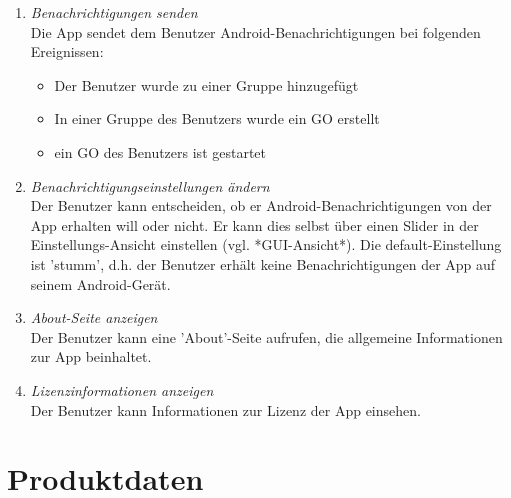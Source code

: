 \documentclass[parskip=full]{scrartcl}
\def\threedigits#1{%
  \ifnum#1<100 0\fi
  \ifnum#1<10 0\fi
  \number#1}
\begin{document}
\begin{enumerate}[label={\textbf{/F\protect\threedigits{\theenumi}0/}}, leftmargin=*, resume]	
 \item \colorbox{shadecolor}{\textit{Benachrichtigungen senden}}\\
	Die App sendet dem Benutzer Android-Benachrichtigungen bei folgenden Ereignissen:
	\begin{itemize}
		\item Der Benutzer wurde zu einer Gruppe hinzugefügt
		\item In einer Gruppe des Benutzers wurde ein GO erstellt
		\item ein GO des Benutzers ist gestartet
	\end{itemize}
	\item \colorbox{shadecolor}{\textit{Benachrichtigungseinstellungen ändern}} \\
	Der Benutzer kann entscheiden, ob er Android-Benachrichtigungen von der App erhalten will oder nicht. Er kann dies selbst über einen Slider in der Einstellungs-Ansicht einstellen (vgl. *GUI-Ansicht*). Die default-Einstellung ist 'stumm', d.h. der Benutzer erhält keine Benachrichtigungen der App auf seinem Android-Gerät.
	\item \textit{About-Seite anzeigen} \\
	Der Benutzer kann eine 'About'-Seite aufrufen, die allgemeine Informationen zur App beinhaltet.
	\item \textit{Lizenzinformationen anzeigen} \\
	Der Benutzer kann Informationen zur Lizenz der App einsehen.
\end{enumerate}

\newpage
\section{Produktdaten}
\end{document}
